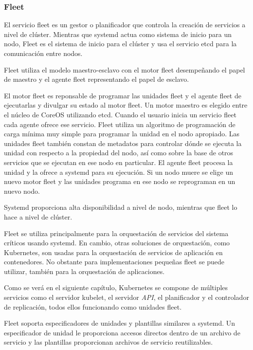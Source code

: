 \subsubsection{Fleet}

El servicio fleet es un gestor o planificador que controla la creación de servicios a nivel de clúster. Mientras que systemd actua como sistema de inicio para un nodo, Fleet es el sistema de inicio para el clúster y usa el servicio etcd para la comunicación entre nodos.

Fleet utiliza el modelo maestro-esclavo con el motor fleet desempeñando el papel de maestro y el agente fleet representando el papel de esclavo.

El motor fleet es reponsable de programar las unidades fleet y el agente fleet de ejecutarlas y divulgar su estado al motor fleet. Un motor maestro es elegido entre el núcleo de CoreOS utilizando etcd. Cuando el usuario inicia un servicio fleet cada agente ofrece ese servicio. Fleet utiliza un algoritmo de programación de carga mínima muy simple para programar la unidad en el nodo apropiado. Las unidades fleet también constan de metadatos para controlar dónde se ejecuta la unidad con respecto a la propiedad del nodo, así como sobre la base de otros servicios que se ejecutan en ese nodo en particular. El agente fleet procesa la unidad y la ofrece a systemd para su ejecución. Si un nodo muere se elige un nuevo motor fleet y las unidades programa en ese nodo se reprograman en un nuevo nodo. 

Systemd proporciona alta disponibilidad a nivel de nodo, mientras que fleet lo hace a nivel de clúster.

Fleet se utiliza principalmente para la orquestación de servicios del sistema críticos usando systemd. En cambio, otras soluciones de orquestación, como Kubernetes, son usadas para la orquestación de servicios de aplicación en contenedores. No obstante para implementaciones pequeñas fleet se puede utilizar, también para la orquestación de aplicaciones.

Como se verá en el siguiente capítulo, Kubernetes se compone de múltiples servicios como el servidor kubelet, el servidor \textit{API}, el planificador y el controlador de replicación, todos ellos funcionando como unidades fleet. 

Fleet soporta especificadores de unidades y plantillas similares a systemd. Un especificador de unidad le proporciona accesos directos dentro de un archivo de servicio y las plantillas proporcionan archivos de servicio reutilizables.

